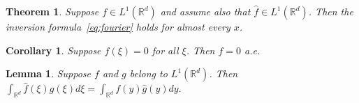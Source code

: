 \documentclass{report}
\theoremstyle{upthm}
\newtheorem{thm}{Theorem}
\newtheorem{lemma}{Lemma}
\newtheorem{cor}{Corollary}
\newcommand{\reals}{\mathbb{R}}
\begin{document}
\begin{thm}
	Suppose $f \in L^1(\reals^d)$ and assume also that $ \hat{f} \in L^1(\reals^d)$.
	Then the inversion formula~\eqref{eq:fourier} holds for almost every $x$.
\end{thm}

\begin{cor}
	Suppose $\hat{f}(\xi) = 0$ for all $\xi$. Then $f = 0$ a.e.
\end{cor}

\begin{lemma}
	Suppose $f$ and $g$ belong to $L^1(\reals^d)$. Then $\int_{\reals^d} \hat{f}(\xi) g(\xi) d\xi = \int_{\reals^d} f(y) \hat{g}(y) dy.$
\end{lemma}
\end{document}
